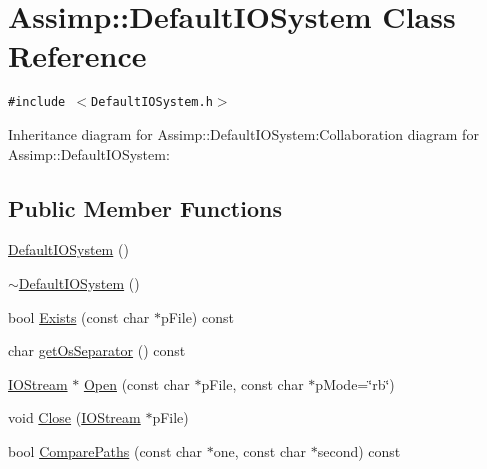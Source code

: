 \hypertarget{class_assimp_1_1_default_i_o_system}{
\section{Assimp::DefaultIOSystem Class Reference}
\label{class_assimp_1_1_default_i_o_system}
}
{\tt \#include $<$DefaultIOSystem.h$>$}

Inheritance diagram for Assimp::DefaultIOSystem:Collaboration diagram for Assimp::DefaultIOSystem:\subsection*{Public Member Functions}
\begin{CompactItemize}
\item 
\hyperlink{class_assimp_1_1_default_i_o_system_8d1b0591ff59be2823f8aaea9fb322e6}{DefaultIOSystem} ()
\item 
\hyperlink{class_assimp_1_1_default_i_o_system_25d4b5ee7d9eff449cca8ce5889b91cc}{$\sim$DefaultIOSystem} ()
\item 
bool \hyperlink{class_assimp_1_1_default_i_o_system_f8b310025faaed12c6d65c586e935255}{Exists} (const char $\ast$pFile) const 
\item 
char \hyperlink{class_assimp_1_1_default_i_o_system_154a94adf38921d9fce50ef598f0a50c}{getOsSeparator} () const 
\item 
\hyperlink{class_assimp_1_1_i_o_stream}{IOStream} $\ast$ \hyperlink{class_assimp_1_1_default_i_o_system_9c8da3d63312f47b2dec83ec90aa2c4d}{Open} (const char $\ast$pFile, const char $\ast$pMode=\char`\"{}rb\char`\"{})
\item 
void \hyperlink{class_assimp_1_1_default_i_o_system_a164cf18562082effde576752377bea3}{Close} (\hyperlink{class_assimp_1_1_i_o_stream}{IOStream} $\ast$pFile)
\item 
bool \hyperlink{class_assimp_1_1_default_i_o_system_0eb1be0b288bdad621f9036bd5290fe7}{ComparePaths} (const char $\ast$one, const char $\ast$second) const 
\end{CompactItemize}
